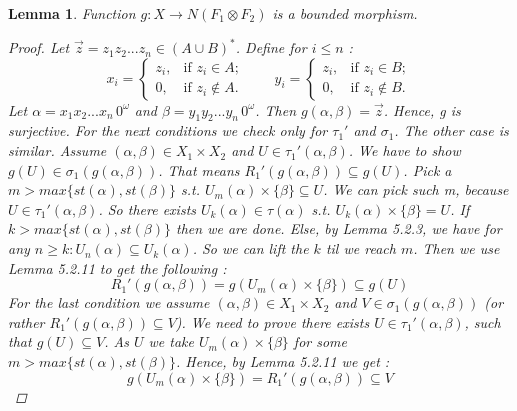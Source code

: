 \documentclass[12pt, a4paper]{scrartcl}
\newtheorem{lemma}[definition]{Lemma}
\begin{document}
\begin{lemma}
    Function $g : X \rightarrow N(F_1 \otimes F_2)$ is a bounded morphism.

    \begin{proof}
        Let $\vec{z} = z_1z_2...z_n \in (A \cup B)^*$. Define for $i \leq n$ :
        \[
            x_i = 
            \begin{cases}
            z_i, & \text{if } z_i \in A; \\
            0, & \text{if } z_i \notin A.
            \end{cases}
            \qquad
            y_i = 
            \begin{cases}
            z_i, & \text{if } z_i \in B; \\
            0, & \text{if } z_i \notin B.
            \end{cases}
        \] \newline
        Let $\alpha = x_1x_2...x_n \, 0^\omega$ and $\beta = y_1y_2...y_n \, 0^\omega$. Then $g(\alpha,\beta) = \vec{z}$. Hence, g is surjective. \newline \newline
        For the next conditions we check only for $\tau_1'$ and $\sigma_1$. The other case is similar.
        Assume $(\alpha,\beta) \in X_1 \times X_2$ and $U \in \tau_1'(\alpha, \beta)$. We have to show $g(U) \in \sigma_1(g(\alpha,\beta))$. That means $R_1'(g(\alpha,\beta)) \subseteq g(U)$.
        Pick a $m > max\{st(\alpha), st(\beta)\}$ s.t. $U_m(\alpha) \times \{\beta\} \subseteq U$. We can pick such m, because $U \in \tau_1'(\alpha,\beta)$. So there exists $U_k(\alpha) \in \tau(\alpha)$ s.t. $U_k(\alpha) \times \{\beta\} = U$.
        If $k > max\{st(\alpha), st(\beta)\}$ then we are done. Else, by Lemma 5.2.3, we have for any $n \geq k : U_n(\alpha) \subseteq U_k(\alpha)$. So we can lift the $k$ til we reach $m$. Then we use Lemma 5.2.11 to get the following :
        $$R_1'(g(\alpha,\beta)) = g(U_m(\alpha) \times \{\beta\}) \subseteq g(U)$$
        \newline
        For the last condition we assume $(\alpha, \beta) \in X_1 \times X_2$ and $V \in \sigma_1(g(\alpha,\beta))$ (or rather $R_1'(g(\alpha,\beta)) \subseteq V$).
        We need to prove there exists $U \in \tau_1'(\alpha,\beta)$, such that $g(U) \subseteq V$. As $U$ we take $U_m(\alpha) \times \{\beta\}$ for some $m > max\{st(\alpha), st(\beta)\}$. Hence, by Lemma 5.2.11 we get :
        $$g(U_m(\alpha) \times \{\beta\}) = R_1'(g(\alpha,\beta)) \subseteq V$$ 
    \end{proof}
    
\end{lemma} 
\end{document}
